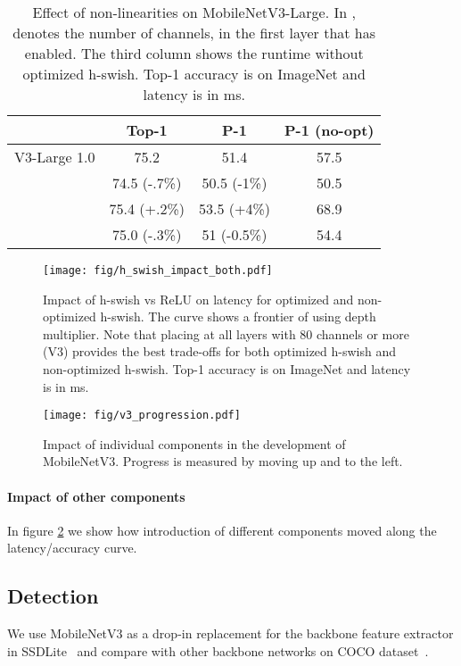 \documentclass[10pt,twocolumn,letterpaper]{article}
\begin{document}
\begin{table}[t]
\centering
\begin{tabular}{l|c|c|c}
\toprule[0.2em]
         & Top-1  &  P-1 & P-1 (no-opt) \\
\hline
V3-Large 1.0       & 75.2   & 51.4 & 57.5 \\ \hline
  & 74.5 ({\color{red}-.7\%})   & 50.5 ({\color{green}-1\%}) & 50.5 \\
      & 75.4 (+.2\%)   & 53.5 ({\color{red}+4\%}) & 68.9 \\
 & 75.0 (-.3\%)  & 51  ({-0.5\%}) & 54.4  \\
\toprule[0.2em]
\end{tabular}
\caption{Effect of non-linearities on MobileNetV3-Large. In ,  denotes the number of channels, in the first layer that has  enabled.  The third column shows the runtime without optimized h-swish. Top-1 accuracy is on ImageNet and latency is in ms.}
\label{table:nonlinearities}
\end{table}
\begin{figure}
    \centering
\texttt{[image: fig/h\_swish\_impact\_both.pdf]}
\caption{Impact of h-swish vs ReLU on latency for optimized and non-optimized h-swish. The curve shows a frontier of using depth multiplier. Note that placing   at all layers with 80 channels or more (V3) provides the best trade-offs  for both optimized h-swish and non-optimized h-swish.  Top-1 accuracy is on ImageNet and latency is in ms. }
    \label{fig:nonlinearities}
\end{figure}

\begin{figure}
    \centering
    \texttt{[image: fig/v3\_progression.pdf]}
    \caption{Impact of individual components in the development of MobileNetV3. Progress is measured by moving up and to the left.}
    \label{fig:v3_progression}
\end{figure}

\paragraph{Impact of other components} In figure \ref{fig:v3_progression}
we show how introduction of different components moved along the latency/accuracy curve. 

\subsection{Detection}
We use MobileNetV3 as a drop-in replacement for the backbone feature extractor in SSDLite~\cite{mobilenetv2} and compare with other backbone networks on COCO dataset~\cite{COCO}. 
\end{document}
